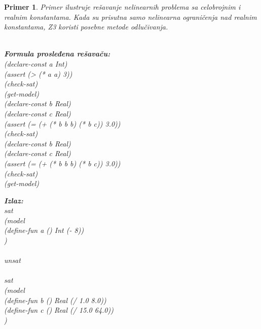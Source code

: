 \documentclass[12pt,oneside]{memoir}
\newcommand\tab[1][0.5cm]{\hspace*{#1}}
\newtheorem{primer}{Primer}
\begin{document}
\begin{primer} Primer ilustruje rešavanje nelinearnih problema sa celobrojnim i realnim konstantama. Kada su prisutna samo nelinearna ograničenja nad realnim konstantama, Z3 koristi posebne metode odlučivanja. \\ \\
\begin{minipage}[b]{0.43\textwidth}
\textbf{Formula prosleđena rešavaču:}
\\(declare-const a Int)
\\(assert (> (* a a) 3))
\\(check-sat)
\\(get-model)
\\(declare-const b Real)
\\(declare-const c Real)
\\(assert (= (+ (* b b b) (* b c)) 3.0))
\\(check-sat)
\\(declare-const b Real)
\\(declare-const c Real)
\\(assert (= (+ (* b b b) (* b c)) 3.0))
\\(check-sat)
\\(get-model)

\end{minipage}
\hspace{1cm}
\begin{minipage}[t]{0.45\textwidth}
\vspace{-8.5cm}
\textbf{Izlaz:}
\\sat 
\\(model 
\\\tab(define-fun a () Int (- 8))
\\) 
\\
\\unsat 
\\
\\sat 
\\(model 
\\\tab(define-fun b () Real (/ 1.0 8.0)) 
\\\tab(define-fun c () Real (/ 15.0 64.0))
\\)
\end{minipage}
\end{primer}
\end{document}
